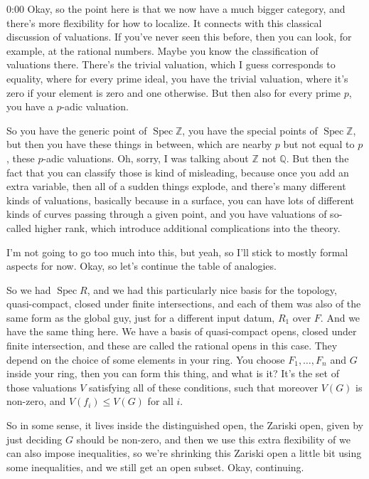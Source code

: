 \begin{unfinished}{0:00}
Okay, so the point here is that we now have a much bigger category, and there's more flexibility for how to localize. It connects with this classical discussion of valuations. If you've never seen this before, then you can look, for example, at the rational numbers. Maybe you know the classification of valuations there. There's the trivial valuation, which I guess corresponds to equality, where for every prime ideal, you have the trivial valuation, where it's zero if your element is zero and one otherwise. But then also for every prime $p$, you have a $p$-adic valuation.

So you have the generic point of $\operatorname{Spec} \mathbb{Z}$, you have the special points of $\operatorname{Spec} \mathbb{Z}$, but then you have these things in between, which are nearby $p$ but not equal to $p$, these $p$-adic valuations. Oh, sorry, I was talking about $\mathbb{Z}$ not $\mathbb{Q}$. But then the fact that you can classify those is kind of misleading, because once you add an extra variable, then all of a sudden things explode, and there's many different kinds of valuations, basically because in a surface, you can have lots of different kinds of curves passing through a given point, and you have valuations of so-called higher rank, which introduce additional complications into the theory. 

I'm not going to go too much into this, but yeah, so I'll stick to mostly formal aspects for now. Okay, so let's continue the table of analogies.

So we had $\operatorname{Spec} R$, and we had this particularly nice basis for the topology, quasi-compact, closed under finite intersections, and each of them was also of the same form as the global guy, just for a different input datum, $R_1$ over $F$. And we have the same thing here. We have a basis of quasi-compact opens, closed under finite intersection, and these are called the rational opens in this case. They depend on the choice of some elements in your ring. You choose $F_1, \dots, F_n$ and $G$ inside your ring, then you can form this thing, and what is it? It's the set of those valuations $V$ satisfying all of these conditions, such that moreover $V(G)$ is non-zero, and $V(f_i) \leq V(G)$ for all $i$.

So in some sense, it lives inside the distinguished open, the Zariski open, given by just deciding $G$ should be non-zero, and then we use this extra flexibility of we can also impose inequalities, so we're shrinking this Zariski open a little bit using some inequalities, and we still get an open subset. Okay, continuing.


\end{unfinished}
